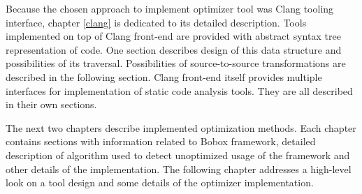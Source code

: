 Because the chosen approach to implement optimizer tool was Clang tooling interface, chapter \ref{clang} is dedicated to its detailed description. Tools implemented on top of Clang front-end are provided with abstract syntax tree representation of code. One section describes design of this data structure and possibilities of its traversal. Possibilities of source-to-source transformations are described in the following section. Clang front-end itself provides multiple interfaces for implementation of static code analysis tools. They are all described in their own sections.

The next two chapters describe implemented optimization methods. Each chapter contains sections with information related to Bobox framework, detailed description of algorithm used to detect unoptimized usage of the framework and other details of the implementation. The following chapter addresses a high-level look on a tool design and some details of the optimizer implementation.